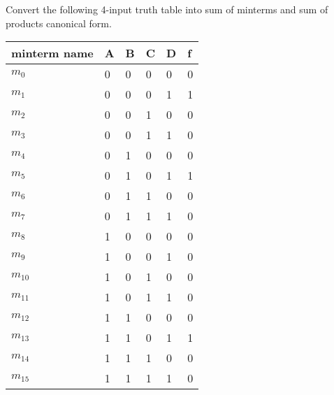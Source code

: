 \begin{example}
  Convert the following 4-input truth table into sum of minterms and sum of products canonical form.

  \noindent \begin{tabular}{p{20mm}llll|l}
    \toprule
    minterm name & A & B & C & D & f \\
    \midrule
    $m_0$ & 0 & 0 & 0 & 0 & 0 \\ 
    $m_1$ & 0 & 0 & 0 & 1 & 1 \\ 
    $m_2$ & 0 & 0 & 1 & 0 & 0 \\ 
    $m_3$ & 0 & 0 & 1 & 1 & 0 \\ 
    $m_4$ & 0 & 1 & 0 & 0 & 0 \\ 
    $m_5$ & 0 & 1 & 0 & 1 & 1 \\ 
    $m_6$ & 0 & 1 & 1 & 0 & 0 \\ 
    $m_7$ & 0 & 1 & 1 & 1 & 0 \\ 
    $m_8$ & 1 & 0 & 0 & 0 & 0 \\ 
    $m_9$ & 1 & 0 & 0 & 1 & 0 \\ 
    $m_{10}$ & 1 & 0 & 1 & 0 & 0 \\
    $m_{11}$ & 1 & 0 & 1 & 1 & 0 \\
    $m_{12}$ & 1 & 1 & 0 & 0 & 0 \\
    $m_{13}$ & 1 & 1 & 0 & 1 & 1 \\
    $m_{14}$ & 1 & 1 & 1 & 0 & 0 \\
    $m_{15}$ & 1 & 1 & 1 & 1 & 0 \\
    \bottomrule
  \end{tabular}
\end{example}


